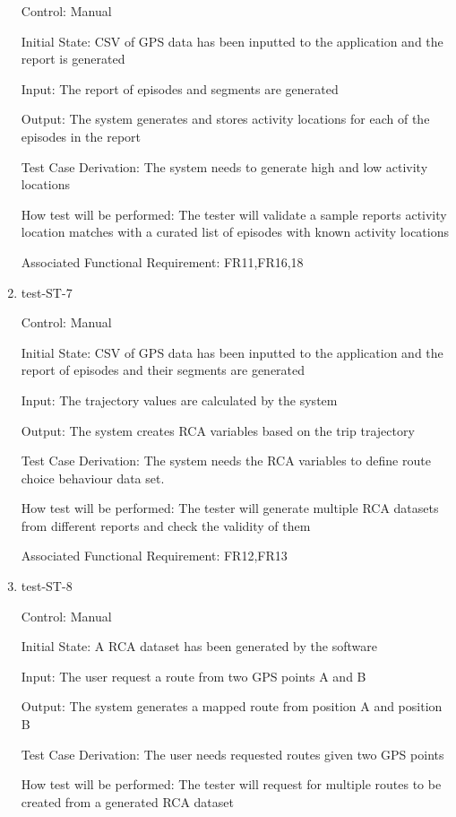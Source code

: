 \documentclass[12pt, titlepage]{article}
\begin{document}
\begin{enumerate}
Control: Manual
					
Initial State: CSV of GPS data has been inputted to the application and the report is generated
					
Input: The report of episodes and segments are generated
					
Output: The system generates and stores activity locations for each of the episodes in the report

Test Case Derivation: The system needs to generate high and low activity locations

How test will be performed: The tester will validate a sample reports activity location matches with a curated list of episodes with known activity locations

Associated Functional Requirement: FR11,FR16,18

\item{test-ST-7\\}

Control: Manual
					
Initial State: CSV of GPS data has been inputted to the application and the report of episodes and their segments are generated
					
Input: The trajectory values are calculated by the system
					
Output: The system creates RCA variables based on the trip trajectory 

Test Case Derivation: The system needs the RCA variables to define route choice behaviour data set. 

How test will be performed: The tester will generate multiple RCA datasets from different reports and check the validity of them

Associated Functional Requirement: FR12,FR13

\item{test-ST-8\\}

Control: Manual
					
Initial State: A RCA dataset has been generated by the software
					
Input: The user request a route from two GPS points A and B 
					
Output: The system generates a mapped route from position A and position B 

Test Case Derivation: The user needs requested routes given two GPS points

How test will be performed: The tester will request for multiple routes to be created from a generated RCA dataset


\end{enumerate}
\end{document}
